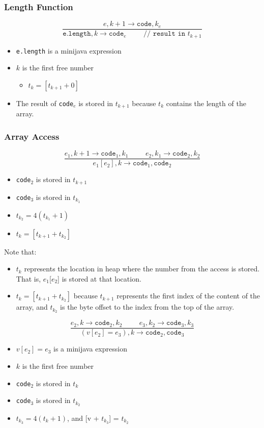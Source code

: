 \documentclass[10pt]{article}
\begin{document}
\subsubsection*{Length Function}
\[\frac{e, k + 1 \rightarrow \texttt{code}, k_e}{\texttt{e.length}, k \rightarrow \texttt{code}_e \hspace{1cm}\texttt{// result in $t_{k + 1}$}}\]
\begin{itemize}
    \item \texttt{e.length} is a minijava expression
    \item $k$ is the first free number
    \begin{itemize}
        \item $t_k = [t_{k + 1} + 0]$
    \end{itemize}
    \item The result of \texttt{code$_e$} is stored in $t_{k + 1}$ because $t_k$ contains the length of the array.
\end{itemize}   

\subsubsection*{Array Access}
\[\frac{e_1, k + 1 \rightarrow \texttt{code}_1, k_1 \hspace{1cm} e_2, k_1 \rightarrow \texttt{code}_2, k_2}{e_1[e_2], k \rightarrow \texttt{code}_1, \texttt{code}_2}\]
\begin{itemize}
    \item \texttt{code}$_2$ is stored in $t_{k + 1}$
    \item \texttt{code}$_3$ is stored in $t_{k_1}$
    \item $t_{k_2} = 4(t_{k_1} + 1)$
    \item $t_k = [t_{k + 1} + t_{k_2}]$
\end{itemize}
Note that:
\begin{itemize}
    \item $t_k$ represents the location in heap where the number from the access is stored.  That is, $e_1$[$e_2$] is stored at that location.
    \item $t_k = [t_{k + 1} + t_{k_2}]$ because $t_{k + 1}$ represents the first index of the content of the array, and $t_{k_2}$ is the byte offset to the index from the top of the array.
\end{itemize}


\[\frac{e_2, k \rightarrow \texttt{code}_2, k_2 \hspace{1cm} e_3, k_2 \rightarrow \texttt{code}_3, k_3}{(v[e_2] = e_3), k \rightarrow \texttt{code}_2, \texttt{code}_3}\]
\begin{itemize}
    \item $v[e_2] = e_3$ is a minijava expression
    \item $k$ is the first free number
    \item \texttt{code}$_2$ is stored in $t_k$
    \item \texttt{code}$_3$ is stored in $t_{k_2}$
    \item $t_{k_3} = 4(t_k + 1)$, and [v + $t_{k_3}$] = $t_{k_2}$
\end{itemize}
\end{document}
